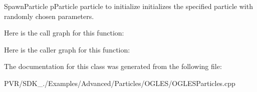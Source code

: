   Spawn\+Particle  p\+Particle particle to initialize  initializes the specified particle with randomly chosen parameters. 

Here is the call graph for this function\+:




Here is the caller graph for this function\+:




The documentation for this class was generated from the following file\+:\begin{DoxyCompactItemize}
\item 
P\+V\+R/\+S\+D\+K\+\_./\+Examples/\+Advanced/\+Particles/\+O\+G\+L\+E\+S/O\+G\+L\+E\+S\+Particles.\+cpp\end{DoxyCompactItemize}
